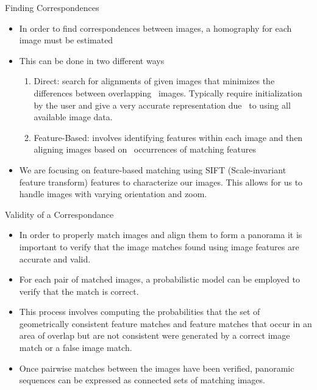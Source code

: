 \documentclass{beamer}
\begin{document}
\begin{frame}{Finding Correspondences}
        \begin{itemize}
            \item In order to find correspondences between images, a homography for each image must be estimated
            \item This can be done in two different ways
            	\begin{enumerate}
			\item Direct: search for alignments of given images that minimizes the differences between overlapping \
					 images. Typically require initialization by the user and give a very accurate representation due \
					 to using all available image data.
			\item Feature-Based: involves identifying features within each image and then aligning images based on \
					 occurrences of matching features
		\end{enumerate}
	   \item We are focusing on feature-based matching using SIFT (Scale-invariant feature transform) features to characterize our images. This allows for us to handle images with varying orientation and zoom.
        \end{itemize}
\end{frame}

\begin{frame}{Validity of a Correspondance}
        \begin{itemize}
            \item In order to properly match images and align them to form a panorama it is important to verify that the image matches found using image features are accurate and valid.
            \item For each pair of matched images, a probabilistic model can be employed to verify that the match is correct.
            \item This process involves computing the probabilities that the set of geometrically consistent feature matches and feature matches that occur in an area of overlap but are not consistent were generated by a correct image match or a false image match.
            \item Once pairwise matches between the images have been verified, panoramic sequences can be expressed as connected sets of matching images.
        \end{itemize}
\end{frame}
\end{document}
